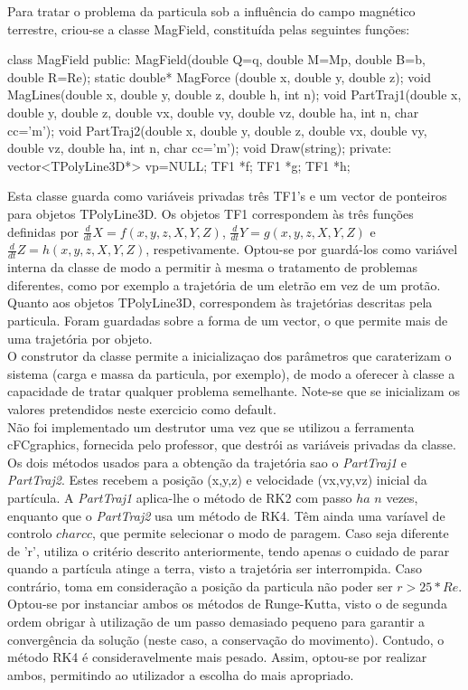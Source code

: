 \documentclass{article}
\begin{document}
\begin{multicols}{2}
Para tratar o problema da particula sob a influência do campo magnético terrestre, criou-se a classe MagField, constituída pelas seguintes funções:

class MagField{
public:
MagField(double Q=q, double M=Mp, double B=b, double R=Re);
static double* MagForce (double x, double y, double z);
void MagLines(double x, double y, double z, double h, int n);
void PartTraj1(double x, double y, double z, double vx, double vy, double vz, double ha, int n, char cc='m');
void PartTraj2(double x, double y, double z, double vx, double vy, double vz, double ha, int n, char cc='m');
void Draw(string);
private:
vector<TPolyLine3D*> vp=NULL;
TF1 *f;
TF1 *g;
TF1 *h;
}

Esta classe guarda como variáveis privadas três TF1's e um vector de ponteiros para objetos TPolyLine3D. Os objetos TF1 correspondem às três funções definidas por $\frac{d }{dt}X = f(x,y,z,X,Y,Z)$, $\frac{d }{dt}Y = g(x,y,z,X,Y,Z)$ e $\frac{d }{d t}Z = h(x,y,z,X,Y,Z)$, respetivamente. Optou-se por guardá-los como variável interna da classe de modo a permitir à mesma o tratamento de problemas diferentes, como por exemplo a trajetória de um eletrão em vez de um protão. Quanto aos objetos TPolyLine3D, correspondem às trajetórias descritas pela particula. Foram guardadas sobre a forma de um vector, o que permite mais de uma trajetória por objeto.\\

O construtor da classe permite a inicializaçao dos parâmetros que caraterizam o sistema (carga e massa da particula, por exemplo), de modo a oferecer à classe a capacidade de tratar qualquer problema semelhante. Note-se que se inicializam os valores pretendidos neste exercicio como default.\\

Não foi implementado um destrutor uma vez que se utilizou a ferramenta cFCgraphics, fornecida pelo professor, que destrói as variáveis privadas da classe.\\ 

Os dois métodos usados para a obtenção da trajetória sao o \textit{PartTraj1} e \textit{PartTraj2}. Estes recebem a posição (x,y,z) e velocidade (vx,vy,vz) inicial da partícula. A \textit{PartTraj1} aplica-lhe o método de RK2 com passo $ha$ $n$ vezes, enquanto que o \textit{PartTraj2} usa um método de RK4. Têm ainda uma varíavel de controlo $char cc$, que permite selecionar o modo de paragem. Caso seja diferente de 'r', utiliza o critério descrito anteriormente, tendo apenas o cuidado de parar quando a partícula atinge a terra, visto a trajetória ser interrompida. Caso contrário, toma em consideração a posição da particula não poder ser $r>25*Re$. Optou-se por instanciar ambos os métodos de Runge-Kutta, visto o de segunda ordem obrigar à utilização de um passo demasiado pequeno para garantir a convergência da solução (neste caso, a conservação do movimento). Contudo, o método RK4 é consideravelmente mais pesado. Assim, optou-se por realizar ambos, permitindo ao utilizador a escolha do mais apropriado.\\


\end{multicols}
\end{document}
